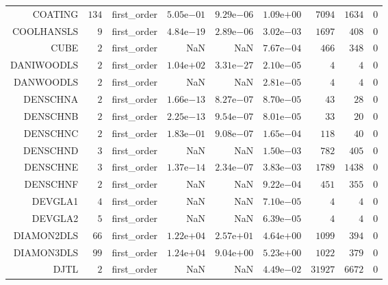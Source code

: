 \begin{longtable}{rrrrrrrrr}
COATING & \(   134\) & first\_order & \( 5.05\)e\(-01\) & \( 9.29\)e\(-06\) & \( 1.09\)e\(+00\) & \(  7094\) & \(  1634\) & \(     0\) \\
COOLHANSLS & \(     9\) & first\_order & \( 4.84\)e\(-19\) & \( 2.89\)e\(-06\) & \( 3.02\)e\(-03\) & \(  1697\) & \(   408\) & \(     0\) \\
CUBE & \(     2\) & first\_order &       NaN &       NaN & \( 7.67\)e\(-04\) & \(   466\) & \(   348\) & \(     0\) \\
DANIWOODLS & \(     2\) & first\_order & \( 1.04\)e\(+02\) & \( 3.31\)e\(-27\) & \( 2.10\)e\(-05\) & \(     4\) & \(     4\) & \(     0\) \\
DANWOODLS & \(     2\) & first\_order &       NaN &       NaN & \( 2.81\)e\(-05\) & \(     4\) & \(     4\) & \(     0\) \\
DENSCHNA & \(     2\) & first\_order & \( 1.66\)e\(-13\) & \( 8.27\)e\(-07\) & \( 8.70\)e\(-05\) & \(    43\) & \(    28\) & \(     0\) \\
DENSCHNB & \(     2\) & first\_order & \( 2.25\)e\(-13\) & \( 9.54\)e\(-07\) & \( 8.01\)e\(-05\) & \(    33\) & \(    20\) & \(     0\) \\
DENSCHNC & \(     2\) & first\_order & \( 1.83\)e\(-01\) & \( 9.08\)e\(-07\) & \( 1.65\)e\(-04\) & \(   118\) & \(    40\) & \(     0\) \\
DENSCHND & \(     3\) & first\_order &       NaN &       NaN & \( 1.50\)e\(-03\) & \(   782\) & \(   405\) & \(     0\) \\
DENSCHNE & \(     3\) & first\_order & \( 1.37\)e\(-14\) & \( 2.34\)e\(-07\) & \( 3.83\)e\(-03\) & \(  1789\) & \(  1438\) & \(     0\) \\
DENSCHNF & \(     2\) & first\_order &       NaN &       NaN & \( 9.22\)e\(-04\) & \(   451\) & \(   355\) & \(     0\) \\
DEVGLA1 & \(     4\) & first\_order &       NaN &       NaN & \( 7.10\)e\(-05\) & \(     4\) & \(     4\) & \(     0\) \\
DEVGLA2 & \(     5\) & first\_order &       NaN &       NaN & \( 6.39\)e\(-05\) & \(     4\) & \(     4\) & \(     0\) \\
DIAMON2DLS & \(    66\) & first\_order & \( 1.22\)e\(+04\) & \( 2.57\)e\(+01\) & \( 4.64\)e\(+00\) & \(  1099\) & \(   394\) & \(     0\) \\
DIAMON3DLS & \(    99\) & first\_order & \( 1.24\)e\(+04\) & \( 9.04\)e\(+00\) & \( 5.23\)e\(+00\) & \(  1022\) & \(   379\) & \(     0\) \\
DJTL & \(     2\) & first\_order &       NaN &       NaN & \( 4.49\)e\(-02\) & \( 31927\) & \(  6672\) & \(     0\) \\

\end{longtable}
